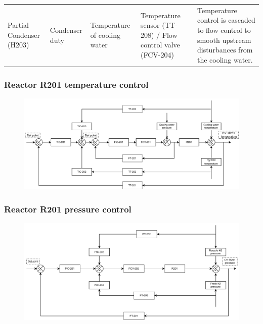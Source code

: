 \begin{table}[h]
{\begin{tabular}{p{3cm}|p{3cm}|p{4cm}|p{5cm}|p{6cm}}
                                            &                                             &                                                         &                                                                            &                                                                                                                                      \\ \midrule
Partial Condenser (H203)                    & Condenser duty                              & Temperature of cooling water                            & Temperature sensor (TT-208) / Flow control valve (FCV-204)                 & Temperature control is cascaded to flow control to smooth upstream   disturbances from the cooling water.                            \\ \bottomrule
\end{tabular}}
\end{table}


\subsubsection{Reactor R201 temperature control} %

\begin{figure}
    \centering
    \includegraphics[width=\linewidth]{chapters/4-operation-control/4-Figures/R201-TC.pdf}
    \caption{}
    \label{fig:R201-TC}
\end{figure}

\subsubsection{Reactor R201 pressure control} %
\begin{figure}[H]
    \centering
    \includegraphics[width=\linewidth]{chapters/4-operation-control/4-Figures/R201-PC.pdf}
    \caption{}
    \label{fig:R201-PC}
\end{figure}

